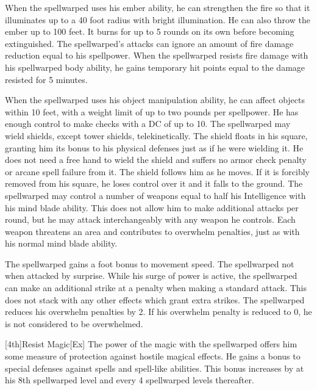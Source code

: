     When the spellwarped uses his ember ability, he can strengthen the fire so that it illuminates up to a 40 foot radius with bright illumination.
    He can also throw the ember up to 100 feet.
    It burns for up to 5 rounds on its own before becoming extinguished.
    The spellwarped's attacks can ignore an amount of fire damage reduction equal to his spellpower.
    When the spellwarped resists fire damage with his spellwarped body ability, he gains temporary hit points equal to the damage resisted for 5 minutes.

    When the spellwarped uses his object manipulation ability, he can affect objects within 10 feet, with a weight limit of up to two pounds per spellpower.
    He has enough control to make checks with a DC of up to 10.
    The spellwarped may wield shields, except tower shields, telekinetically.
    The shield floats in his square, granting him its bonus to his physical defenses just as if he were wielding it.
    He does not need a free hand to wield the shield and suffers no armor check penalty or arcane spell failure from it.
    The shield follows him as he moves.
    If it is forcibly removed from his square, he loses control over it and it falls to the ground.
    The spellwarped may control a number of weapons equal to half his Intelligence with his mind blade ability.
    This does not allow him to make additional attacks per round, but he may attack interchangeably with any weapon he controls.
    Each weapon threatens an area and contributes to overwhelm penalties, just as with his normal mind blade ability.

    The spellwarped gains a  foot bonus to movement speed.
    The spellwarped not \unaware when attacked by surprise.
    While his surge of power is active, the spellwarped can make an additional strike at a  penalty when making a standard attack.
    This does not stack with any other effects which grant extra strikes.
    The spellwarped reduces his overwhelm penalties by 2.
    If his overwhelm penalty is reduced to 0, he is not considered to be overwhelmed.

[4th]{Resist Magic}[Ex]
The power of the magic with the spellwarped offers him some measure of protection against hostile magical effects.
He gains a  bonus to special defenses against spells and spell-like abilities.
This bonus increases by  at his 8th spellwarped level and every 4 spellwarped levels thereafter.

